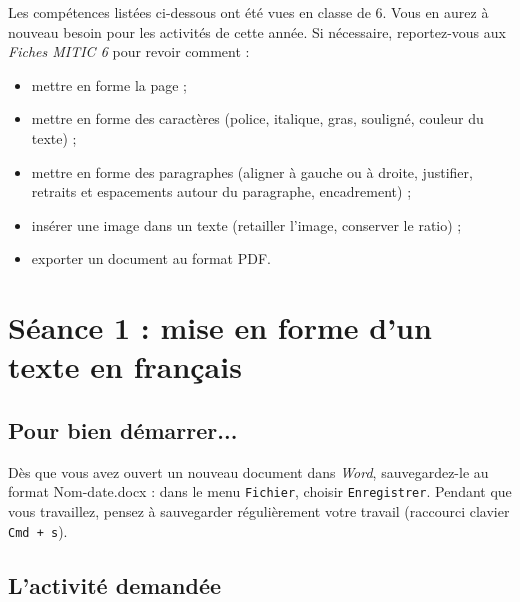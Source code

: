 \phantom{rien}


Les compétences listées ci-dessous ont été vues en classe de 6. Vous en aurez à nouveau besoin pour les activités de cette année. Si nécessaire, reportez-vous aux \emph{Fiches MITIC 6} pour revoir comment :  

\begin{itemize}
\item mettre en forme la page ;
\item mettre en forme des caractères (police, italique, gras, souligné, couleur du texte) ;
\item mettre en forme des paragraphes (aligner à gauche ou à droite, justifier, retraits et espacements autour du paragraphe, encadrement) ;
\item insérer une image dans un texte (retailler l'image, conserver le ratio) ;
\item exporter un document au format PDF.
\end{itemize}







%
%
%
%

\newpage

\section{Séance 1 : mise en forme d'un texte en français}\label{ficheTexte5e1}

\subsection{Pour bien démarrer...}

Dès que vous avez ouvert un nouveau document dans \emph{Word}, sauvegardez-le au format Nom-date.docx : dans le menu \texttt{Fichier}, choisir \texttt{Enregistrer}. Pendant que vous travaillez, pensez à sauvegarder régulièrement votre travail (raccourci clavier \texttt{Cmd + s}).   


\subsection{L'activité demandée}

\vspace{10pt}

